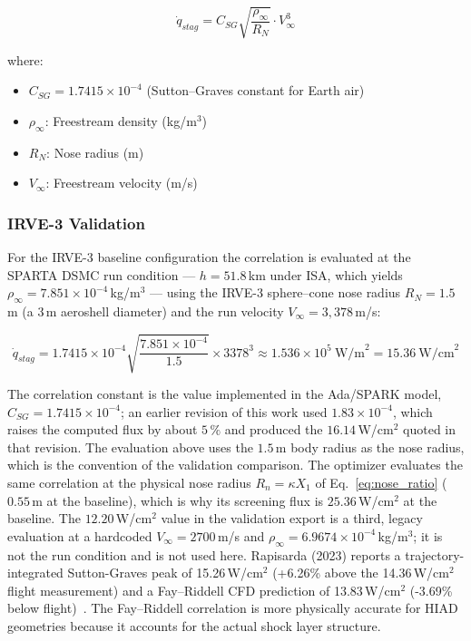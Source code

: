\begin{equation}
    \boxed{\dot{q}_{stag} = C_{SG} \sqrt{\frac{\rho_{\infty}}{R_N}} \cdot V_{\infty}^3}
\end{equation}

where:
\begin{itemize}
    \item $C_{SG} = 1.7415 \times 10^{-4}$ (Sutton--Graves constant for Earth air)
    \item $\rho_{\infty}$: Freestream density (kg/m$^3$)
    \item $R_N$: Nose radius (m)
    \item $V_{\infty}$: Freestream velocity (m/s)
\end{itemize}

\subsubsection*{IRVE-3 Validation}
For the IRVE-3 baseline configuration the correlation is evaluated at the SPARTA DSMC run condition --- $h = 51.8$\,km under ISA, which yields $\rho_{\infty} = 7.851 \times 10^{-4}$\,kg/m$^3$ --- using the IRVE-3 sphere--cone nose radius $R_N = 1.5$\,m (a 3\,m aeroshell diameter) and the run velocity $V_{\infty} = 3{,}378$\,m/s:

\begin{equation}
    \dot{q}_{stag} = 1.7415 \times 10^{-4} \sqrt{\frac{7.851 \times 10^{-4}}{1.5}} \times 3378^3 \approx 1.536 \times 10^{5} \ \text{W/m}^2 = 15.36 \ \text{W/cm}^2
\end{equation}

The correlation constant is the value implemented in the Ada/SPARK model, $C_{SG} = 1.7415 \times 10^{-4}$; an earlier revision of this work used $1.83 \times 10^{-4}$, which raises the computed flux by about $5\,\%$ and produced the $16.14$\,W/cm$^2$ quoted in that revision. The evaluation above uses the $1.5$\,m body radius as the nose radius, which is the convention of the validation comparison. The optimizer evaluates the same correlation at the physical nose radius $R_n=\kappa X_1$ of Eq.~\eqref{eq:nose_ratio} ($0.55$\,m at the baseline), which is why its screening flux is $25.36$\,W/cm$^2$ at the baseline. The $12.20$\,W/cm$^2$ value in the validation export is a third, legacy evaluation at a hardcoded $V_{\infty} = 2700$\,m/s and $\rho_{\infty} = 6.9674 \times 10^{-4}$\,kg/m$^3$; it is not the run condition and is not used here. Rapisarda (2023) reports a trajectory-integrated Sutton-Graves peak of 15.26\,W/cm$^2$ (+6.26\% above the 14.36\,W/cm$^2$ flight measurement) and a Fay--Riddell CFD prediction of 13.83\,W/cm$^2$ (-3.69\% below flight)~\cite{rapisarda2023mdao}. The Fay--Riddell correlation is more physically accurate for HIAD geometries because it accounts for the actual shock layer structure.

